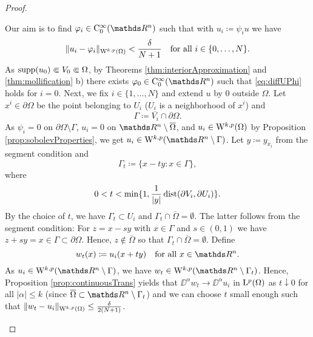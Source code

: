 \begin{proof}
\begin{enumerate}[i)]
      Our aim is to find $\varphi_i \in \CC_0^\infty(\R^n)$ such that with $u_i \coloneqq \psi_i u$ we have
      \begin{equation} \label{eq:diffUPhi}
        \|u_i - \varphi_i\|_{\mathrm{W}^{k,p}(\Omega)} < \frac{\delta}{N + 1} \quad\text{for all } i \in \{0,\dots,N\}.        
      \end{equation}
      As $\operatorname{supp}(u_0) \Subset V_0 \Subset \Omega$, by Theorems \ref{thm:interiorApproximation} and \ref{thm:mollification} b) there exists $\varphi_0 \in \CC_0^\infty(\R^n)$ such that \eqref{eq:diffUPhi} holds for $i = 0$.
      Next, we fix $i \in \{ 1, \dots, N\}$ and extend $u$ by $0$ outside $\Omega$.
      Let $x^i \in \partial \Omega$ be the point belonging to $U_i$ ($U_i$ is a neighborhood of $x^i$) and 
      $$
      \Gamma \coloneqq \overline{V_i} \cap \partial\Omega.
      $$
      As $\psi_i = 0$ on $\partial \Omega \setminus \Gamma$, $u_i = 0$ on $\R^n \setminus \overline{\Omega}$, and $u_i \in \mathrm{W}^{k,p}(\Omega)$ by Proposition \ref{prop:sobolevProperties}, we get $u_i \in \WW^{k,p}(\R^n \setminus \Gamma)$.
      Let $y \coloneqq y_{x_i}$ from the segment condition and 
      $$
      \Gamma_t \coloneqq \{ x - ty \colon x \in \Gamma \},
      $$
      where 
      $$
      0 < t < \min\{1, \frac{1}{|y|} \operatorname{dist}(\partial V_i, \partial U_i)\}.
      $$
      By the choice of $t$, we have $\Gamma_t \subset U_i$ and $\Gamma_t \cap \overline{\Omega} = \emptyset$.
      The latter follows from the segment condition: For $z = x - sy$ with $x \in \Gamma$ and $s \in (0,1)$ we have $z + sy = x \in \Gamma \subset \partial\Omega$.
      Hence, $z \notin\overline{\Omega}$ so that $\Gamma_t \cap \overline\Omega = \emptyset$.
      Define 
      $$
      w_t(x) \coloneqq u_i(x + ty) \quad\text{for all } x \in \R^n.
      $$
      As $u_i \in \WW^{k,p}(\R^n \setminus \Gamma)$, we have $w_t \in \WW^{k,p}(\R^n\setminus \Gamma_t)$.
      Hence, Proposition \ref{prop:continuousTrans} yields that $\DD^\alpha w_t \to \DD^\alpha u_i$ in $\mathrm{L}^p(\Omega)$ as $t \downarrow 0$ for all $|\alpha| \leq k$ (since $\overline\Omega \subset \R^n \setminus \Gamma_t$) and we can choose $t$ small enough such that $\|w_t - u_i \|_{\mathrm{W}^{k,p}(\Omega)} \leq \frac{\delta}{2 ( N + 1 )}$.


\end{enumerate}
\end{proof}

